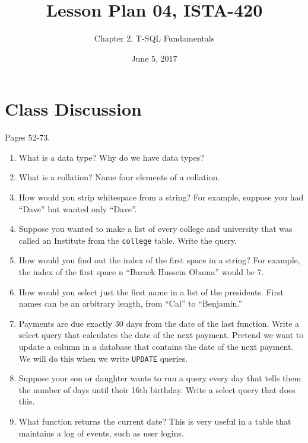 \documentclass{article}
\title{Lesson Plan 04, ISTA-420}
\author{Chapter 2, T-SQL Fundamentals}
\date{June 5, 2017}
\begin{document}
    

    \maketitle{}

    \section{Class Discussion}

    Pages 52-73.

    \begin{enumerate}

        \item What is a data type? Why do we have data types?
        \item What is a collation? Name four elements of a collation.
        \item How would you strip whitespace from a string? For example, suppose you had ``\textvisiblespace{}\textvisiblespace{}\textvisiblespace{}\textvisiblespace{}Dave\textvisiblespace{}\textvisiblespace{}\textvisiblespace{}\textvisiblespace{}'' but wanted only ``Dave''. 
        \item Suppose you wanted to make a list of every college and university that was called an Institute from the \texttt{college} table. Write the query.
        \item How would you find out the index of the first space in a string? For example, the index of the first space n ``Barack Hussein Obama'' would be 7.
        \item How would you select just the first name in a list of the presidents. First names can be an arbitrary length, from ``Cal'' to ``Benjamin.''
        \item Payments are due exactly 30 days from the date of the last function. Write a select query that calculates the date of the next payment. Pretend we want to update a column in a database that contains the date of the next payment. We will do this when we write \texttt{UPDATE} queries. 
        \item Suppose your son or daughter wants to run a query every day that tells them the number of days until their 16th birthday. Write a select query that does this.
        \item What function returns the current date? This is very useful in a table that maintains a log of events, such as user logins.

    \end{enumerate}
\end{document}
